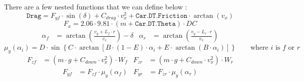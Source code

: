 \documentclass[a4paper, 11pt]{article}
\begin{document}
There are a few nested functions that we can define below :
\begin{equation}
	\texttt{Drag} = F_{yf}\cdot\sin\left(\delta \right) + C_{drag}\cdot v_x^2 + \texttt{Car.DT.Friction}\cdot\arctan\left(v_x \right)
\end{equation}
\begin{equation}
	F_x = 2.06\cdot 9.81\cdot\left(m + \texttt{Car.DT.Theta} \right)\cdot DC
\end{equation}
\vspace*{-2em}
\begin{align}
	\alpha_f &= \arctan\left(\frac{v_y + L_f\cdot r}{v_x} \right) - \delta & \alpha_r &= \arctan\left(\frac{v_y - L_r\cdot r}{v_x} \right)
\end{align}
\begin{equation}
	\mu_y\left(\alpha_i \right) = D\cdot \sin\left\{C\cdot \arctan\left[B\cdot \left(1-E \right)\cdot\alpha_i + E\cdot\arctan\left(B\cdot\alpha_i \right) \right] \right\}\qquad\text{where $i$ is $f$ or $r$}
\end{equation}
\vspace*{-1em}
\begin{align}
	F_{zf} &= \left(m\cdot g + C_{down}\cdot v_x^2 \right)\cdot W_f & F_{zr} &= \left(m\cdot g + C_{down}\cdot v_x^2 \right)\cdot W_r
\end{align}
\vspace*{-1em}
\begin{align}
	F_{yf} &= F_{zf}\cdot \mu_y\left(\alpha_f \right) & F_{yr} &= F_{zr}\cdot \mu_y\left(\alpha_r \right)
\end{align}
\end{document}
